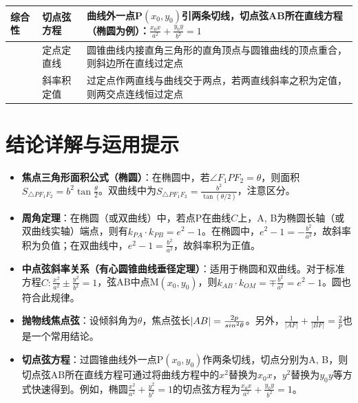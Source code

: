 \documentclass{ctexart}
\begin{document}
		\begin{table}[ht]
			\centering
			\begin{tabular}{|p{1.5cm}|p{2.4cm}|p{8.8cm}|}
				\hline
				\textbf{综合性} & 切点弦方程 & 曲线外一点P$(x_0,y_0)$引两条切线，切点弦AB所在直线方程（椭圆为例）：$\frac{x_0 x}{a^2} + \frac{y_0 y}{b^2} = 1$ \\
				\hline
				& 定点定直线 & 圆锥曲线内接直角三角形的直角顶点与圆锥曲线的顶点重合，则斜边所在直线过定点 \\
				\hline
				& 斜率积定值 & 过定点作两直线与曲线交于两点，若两直线斜率之积为定值，则两交点连线恒过定点 \\
				\hline
			\end{tabular}
	\end{table}
	
	\section*{结论详解与运用提示}
	
	\begin{itemize}
		\item \textbf{焦点三角形面积公式（椭圆）}：在椭圆中，若$\angle F_1PF_2 = \theta$，则面积$S_{\triangle PF_1F_2} = b^2 \tan \frac{\theta}{2}$。双曲线中为$S_{\triangle PF_1F_2} = \frac{b^2}{\tan(\theta/2)}$，注意区分。
		
		\item \textbf{周角定理}：在椭圆（或双曲线）中，若点P在曲线$C$上，A, B为椭圆长轴（或双曲线实轴）端点，则有$k_{PA} \cdot k_{PB} = e^2 - 1$。在椭圆中，$e^2 - 1 = -\frac{b^2}{a^2}$，故斜率积为负值；在双曲线中，$e^2 - 1 = \frac{b^2}{a^2}$，故斜率积为正值。
		
		\item \textbf{中点弦斜率关系（有心圆锥曲线垂径定理）}：适用于椭圆和双曲线。对于标准方程$C: \frac{x^2}{a^2} \pm \frac{y^2}{b^2} = 1$，弦AB中点M$(x_0, y_0)$，则$k_{AB} \cdot k_{OM} = \mp \frac{b^2}{a^2} = e^2 - 1$。圆也符合此规律。
		
		\item \textbf{抛物线焦点弦}：设倾斜角为$\theta$，焦点弦长$|AB| = \frac{2p}{\\sin^2 \theta}$。另外，$\frac{1}{|AF|} + \frac{1}{|BF|} = \frac{2}{p}$也是一个常用结论。
		
		\item \textbf{切点弦方程}：过圆锥曲线外一点P$(x_0, y_0)$作两条切线，切点分别为A, B，则切点弦AB所在直线方程可通过将曲线方程中的$x^2$替换为$x_0x$，$y^2$替换为$y_0y$等方式快速得到。例如，椭圆$\frac{x^2}{a^2} + \frac{y^2}{b^2} = 1$的切点弦方程为$\frac{x_0 x}{a^2} + \frac{y_0 y}{b^2} = 1$。
	\end{itemize}
	
\end{document}
